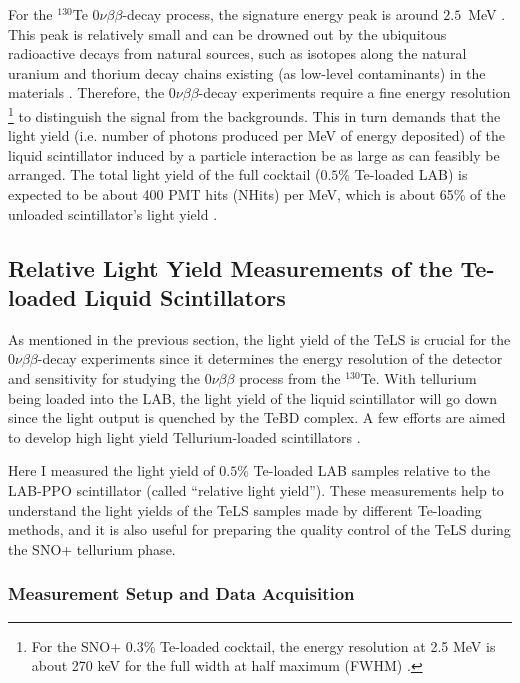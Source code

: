 For the $^{130}${Te} $0\nu\beta\beta$-decay process, the signature energy peak is around $2.5$~MeV \cite{whitepaper}. This peak is relatively small and can be drowned out by the ubiquitous radioactive decays from natural sources, such as isotopes along the natural uranium and thorium decay chains existing (as low-level contaminants) in the materials \cite{whitepaper}. Therefore, the $0\nu\beta\beta$-decay experiments require a fine energy resolution \footnote{For the SNO+ 0.3\% Te-loaded cocktail, the energy resolution at 2.5 MeV is about 270 keV for the full width at half maximum (FWHM) \cite{whitepaper}.} to distinguish the signal from the backgrounds. This in turn demands that the light yield (i.e. number of photons produced per MeV of energy deposited) of the liquid scintillator induced by a particle interaction be as large as can feasibly be arranged. The total light yield of the full cocktail ($0.5\%$ Te-loaded LAB) is expected to be about 400 PMT hits (NHits) per MeV, which is about 65\% of the unloaded scintillator's light yield \cite{biller2017new}.

\subsection{Relative Light Yield Measurements of the Te-loaded Liquid Scintillators}\label{sect:RelativeLightYieldMeasurement}

As mentioned in the previous section, the light yield of the TeLS is crucial for the $0\nu\beta\beta$-decay experiments since it determines the energy resolution of the detector and sensitivity for studying the $0\nu\beta\beta$ process from the $^{130}$Te. With tellurium being loaded into the LAB, the light yield of the liquid scintillator will go down since the light output is quenched by the TeBD complex. A few efforts are aimed to develop high light yield Tellurium-loaded scintillators \cite{biller2017new}.

Here I measured the light yield of $0.5\%$ Te-loaded LAB samples relative to the LAB-PPO scintillator (called ``relative light yield''). These measurements help to understand the light yields of the TeLS samples made by different Te-loading methods, and it is also useful for preparing the quality control of the TeLS during the SNO+ tellurium phase.

\subsubsection{Measurement Setup and Data Acquisition}

